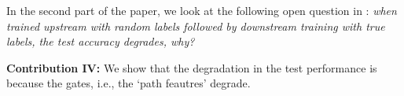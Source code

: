 In the second part of the paper, we look at the following open question in \citep{randlabel}: \emph{when trained upstream with random labels followed by downstream training with true labels, the test accuracy degrades, why?}

\textbf{Contribution IV:} We show that the degradation in the test performance is because the gates, i.e., the `path feautres' degrade.








